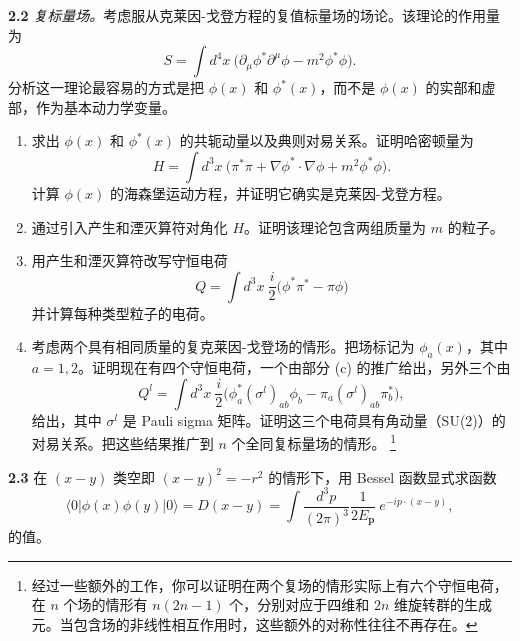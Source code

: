 \textbf{2.2} \emph{复标量场。}考虑服从克莱因-戈登方程的复值标量场的场论。该理论的作用量为
\begin{equation}
  S = \int d^4x\ \bigl( \partial_\mu\phi^{*}\partial^\mu\phi - m^2\phi^{*}\phi
    \bigr).
\end{equation}
分析这一理论最容易的方式是把 $\phi(x)$ 和 $\phi^{*}(x)$，而不是 $\phi(x)$ 的实部和虚部，作为基本动力学变量。
\begin{enumerate}[label=(\alph*)]
  \item 求出 $\phi(x)$ 和 $\phi^{*}(x)$ 的共轭动量以及典则对易关系。证明哈密顿量为
    \begin{equation}
      H = \int d^3x\ \bigl( \pi^{*}\pi + \nabla\phi^{*}\cdot\nabla\phi
        + m^2\phi^{*}\phi \bigr).
    \end{equation}
    计算 $\phi(x)$ 的海森堡运动方程，并证明它确实是克莱因-戈登方程。
  \item 通过引入产生和湮灭算符对角化 $H$。证明该理论包含两组质量为 $m$ 的粒子。
  \item 用产生和湮灭算符改写守恒电荷
    \begin{equation}
      Q = \int d^3x\ \frac{i}{2}\bigl( \phi^{*}\pi^{*} - \pi\phi \bigr)
    \end{equation}
    并计算每种类型粒子的电荷。
  \item 考虑两个具有相同质量的复克莱因-戈登场的情形。把场标记为 $\phi_a(x)$，其中 $a=1,2$。证明现在有四个守恒电荷，一个由部分 (c) 的推广给出，另外三个由
    \begin{equation}
      Q^l = \int d^3x\ \frac{i}{2}\bigl(
        \phi^{*}_a(\sigma^l)_{ab}\phi_b - \pi_a(\sigma^l)_{ab}\pi^{*}_b \bigr),
    \end{equation}
    给出，其中 $\sigma^l$ 是 Pauli sigma 矩阵。证明这三个电荷具有角动量（SU(2)）的对易关系。把这些结果推广到 $n$ 个全同复标量场的情形。%
    \footnote{经过一些额外的工作，你可以证明在两个复场的情形实际上有六个守恒电荷，在 $n$ 个场的情形有 $n(2n-1)$ 个，分别对应于四维和 $2n$ 维旋转群的生成元。当包含场的非线性相互作用时，这些额外的对称性往往不再存在。}
\end{enumerate}

\textbf{2.3} 在 $(x-y)$ 类空即 $(x-y)^2 = -r^2$ 的情形下，用 Bessel 函数显式求函数
\begin{equation}
  \langle 0|\phi(x)\phi(y)|0\rangle = D(x-y) = \int \frac{d^3p}{(2\pi)^3}
    \frac{1}{2E_{\mathbf{p}}}\ e^{-ip\cdot(x-y)},
\end{equation}
的值。
